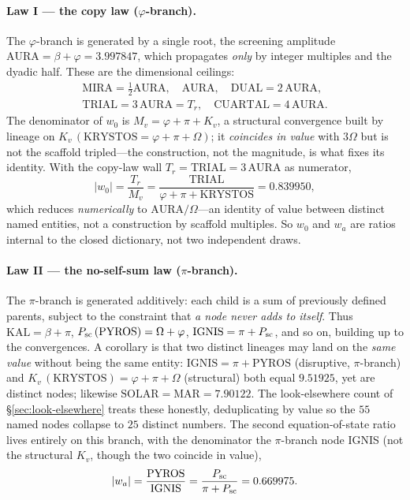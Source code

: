 \documentclass[aps,prd,preprint,amsmath,amssymb,nofootinbib,longbibliography]{revtex4-2}
\begin{document}
\paragraph{Law I --- the copy law ($\varphi$-branch).} The $\varphi$-branch is
generated by a single root, the screening amplitude
$\mathrm{AURA}=\beta+\varphi=3.997847$, which propagates \emph{only} by integer
multiples and the dyadic half. These are the dimensional ceilings:
\begin{equation}
\begin{gathered}
  \mathrm{MIRA}=\tfrac12\mathrm{AURA},\quad
  \mathrm{AURA},\quad
  \mathrm{DUAL}=2\,\mathrm{AURA},\\
  \mathrm{TRIAL}=3\,\mathrm{AURA}=T_r,\quad
  \mathrm{CUARTAL}=4\,\mathrm{AURA}.
\end{gathered}
  \label{eq:copylaw}
\end{equation}
The denominator of $w_0$ is $M_v=\varphi+\pi+K_v$, a structural convergence built
by lineage on $K_v\,(\mathrm{KRYSTOS}=\varphi+\pi+\Omega)$; it \emph{coincides in
value} with $3\Omega$ but is not the scaffold tripled---the construction, not the
magnitude, is what fixes its identity. With the copy-law wall
$T_r=\mathrm{TRIAL}=3\,\mathrm{AURA}$ as numerator,
\begin{equation}
  |w_0|=\frac{T_r}{M_v}=\frac{\mathrm{TRIAL}}{\varphi+\pi+\mathrm{KRYSTOS}}=0.839950 ,
\end{equation}
which reduces \emph{numerically} to $\mathrm{AURA}/\Omega$---an identity of value
between distinct named entities, not a construction by scaffold multiples. So
$w_0$ and $w_a$ are ratios internal to the closed dictionary, not two
independent draws.

\paragraph{Law II --- the no-self-sum law ($\pi$-branch).} The $\pi$-branch is
generated additively: each child is a sum of previously defined parents, subject
to the constraint that \emph{a node never adds to itself}. Thus
$\mathrm{KAL}=\beta+\pi$, $P_{\rm sc}\,(\mathrm{PYROS})=\Omega+\varphi$,
$\mathrm{IGNIS}=\pi+P_{\rm sc}$, and so on, building up to the convergences. A
corollary is that two distinct lineages may land on the \emph{same value}
without being the same entity: $\mathrm{IGNIS}=\pi+\mathrm{PYROS}$ (disruptive,
$\pi$-branch) and $K_v\,(\mathrm{KRYSTOS})=\varphi+\pi+\Omega$ (structural) both
equal $9.51925$, yet are distinct nodes; likewise
$\mathrm{SOLAR}=\mathrm{MAR}=7.90122$. The look-elsewhere count of
\S\ref{sec:look-elsewhere} treats these honestly, deduplicating by value so the
$55$ named nodes collapse to $25$ distinct numbers. The second
equation-of-state ratio lives entirely on this branch, with the denominator the
$\pi$-branch node IGNIS (not the structural $K_v$, though the two coincide in value),
\begin{equation}
  |w_a|=\frac{\mathrm{PYROS}}{\mathrm{IGNIS}}=\frac{P_{\rm sc}}{\pi+P_{\rm sc}}=0.669975 .
\end{equation}
\end{document}

